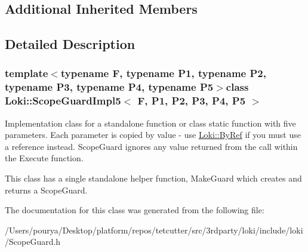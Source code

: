 \subsection*{Additional Inherited Members}


\subsection{Detailed Description}
\subsubsection*{template$<$typename F, typename P1, typename P2, typename P3, typename P4, typename P5$>$class Loki\+::\+Scope\+Guard\+Impl5$<$ F, P1, P2, P3, P4, P5 $>$}

Implementation class for a standalone function or class static function with five parameters. Each parameter is copied by value -\/ use \hyperlink{group__ExceptionGroup_ga0a94ba0342e6abcdb8f9b32ed5ad7e3d}{Loki\+::\+By\+Ref} if you must use a reference instead. Scope\+Guard ignores any value returned from the call within the Execute function.

This class has a single standalone helper function, Make\+Guard which creates and returns a Scope\+Guard. 

The documentation for this class was generated from the following file\+:\begin{DoxyCompactItemize}
\item 
/\+Users/pourya/\+Desktop/platform/repos/tetcutter/src/3rdparty/loki/include/loki/Scope\+Guard.\+h\end{DoxyCompactItemize}
